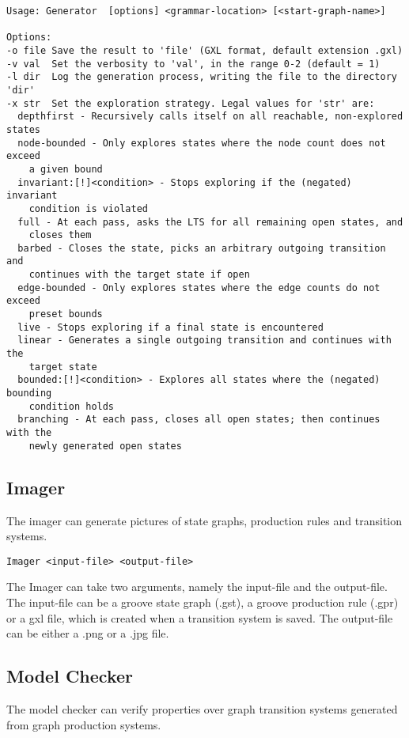 \begin{verbatim}
Usage: Generator  [options] <grammar-location> [<start-graph-name>]

Options:
-o file Save the result to 'file' (GXL format, default extension .gxl)
-v val  Set the verbosity to 'val', in the range 0-2 (default = 1)
-l dir  Log the generation process, writing the file to the directory 'dir'
-x str  Set the exploration strategy. Legal values for 'str' are:
  depthfirst - Recursively calls itself on all reachable, non-explored states
  node-bounded - Only explores states where the node count does not exceed
    a given bound
  invariant:[!]<condition> - Stops exploring if the (negated) invariant 
    condition is violated
  full - At each pass, asks the LTS for all remaining open states, and 
    closes them
  barbed - Closes the state, picks an arbitrary outgoing transition and 
    continues with the target state if open
  edge-bounded - Only explores states where the edge counts do not exceed
    preset bounds
  live - Stops exploring if a final state is encountered
  linear - Generates a single outgoing transition and continues with the 
    target state
  bounded:[!]<condition> - Explores all states where the (negated) bounding 
    condition holds
  branching - At each pass, closes all open states; then continues with the 
    newly generated open states
\end{verbatim}

\subsection{Imager}

The imager can generate pictures of state graphs, production rules and transition systems.

\begin{verbatim}
Imager <input-file> <output-file>
\end{verbatim}

The Imager can take two arguments, namely the input-file and the output-file. The input-file can be a groove state graph (.gst), a groove production rule (.gpr) or a gxl file, which is created when a transition system is saved. The output-file can be either a .png or a .jpg file.

\subsection{Model Checker}

The model checker can verify properties over graph transition systems generated from graph production systems.

